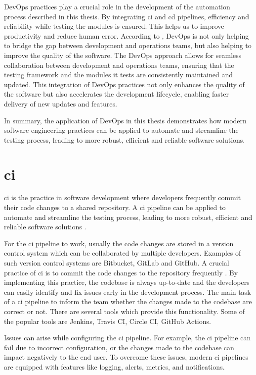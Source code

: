 DevOps practices play a crucial role in the development of the automation process described in this thesis. By integrating \acrfull{ci} and \acrfull{cd} pipelines, 
efficiency and reliability while testing the modules is ensured. This helps us to improve productivity and reduce human error. According to \cite{8257807}, DevOps is not only helping to bridge
the gap between development and operations teams, but also helping to improve the quality of the software.
The DevOps approach allows for seamless collaboration between development and operations teams, 
ensuring that the testing framework and the modules it tests are consistently maintained and updated. This integration of DevOps practices not only enhances the quality of the software but also 
accelerates the development lifecycle, enabling faster delivery of new updates and features.\newline

In summary, the application of DevOps in this thesis demonstrates how modern software engineering practices can be applied to automate and streamline the testing process, leading to more robust,
efficient and reliable software solutions.

\section{\acrlong{ci}}
    \acrfull{ci} is the practice in software development where developers frequently commit their code changes to a shared repository. A \acrshort{ci} pipeline 
    can be applied to automate and streamline the testing process, leading to more robust, efficient and reliable software solutions \cite{8421965}.

    For the \acrshort{ci} pipeline to work, usually the code changes are stored in a version control system which can be collaborated by multiple developers.
    Examples of such version control systems are Bitbucket, GitLab and GitHub. A crucial practice of \acrshort{ci} is to commit the code changes to the repository 
    frequently \cite{6802994}. By implementing this practice, the codebase is always up-to-date and the developers can easily identify and fix issues early in 
    the development process. The main task of a \acrshort{ci} pipeline to inform the team whether the changes made to the codebase are correct or not. There are 
    several tools which provide this functionality. Some of the popular tools are Jenkins, Travis CI, Circle CI, GitHub Actions. 

    Issues can arise while configuring the \acrshort{ci} pipeline. For example, the \acrshort{ci} pipeline can fail due to 
    incorrect configuration, or the changes made to the codebase can impact negatively to the end user. To overcome these issues, modern \acrshort{ci} pipelines are 
    equipped with features like logging, alerts, metrics, and notifications.

